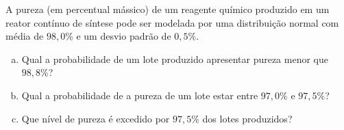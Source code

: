 %
%


\begin{exercicioBanco}[\valorquestao]
A pureza (em percentual mássico) de um reagente químico produzido em um reator contínuo de síntese pode ser modelada por uma distribuição normal com média de $98{,}0\%$ e um desvio padrão de $0{,}5\%$.
%
\begin{enumerate}[(a)]
    \item Qual a probabilidade de um lote produzido apresentar pureza menor que $98{,}8\%$?
    \item Qual a probabilidade de a pureza de um lote estar entre $97{,}0\%$ e $97{,}5\%$?
    \item Que nível de pureza é excedido por $97{,}5\%$ dos lotes produzidos?
\end{enumerate}
%
\end{exercicioBanco}

